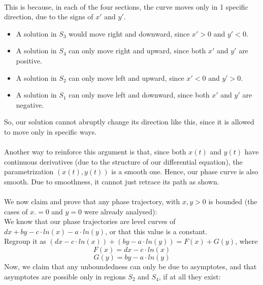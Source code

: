\documentclass{article}
\begin{document}
\\
This is because, in each of the four sections, the curve moves only in 1 specific direction, due to the signs of $x'$ and $y'$. 
\begin{itemize}
    \item A solution in $S_3$ would move right and downward, since $x' > 0$ and $y' < 0$.
    \item A solution in $S_4$ can only move right and upward, since both $x'$ and $y'$ are positive.
    \item A solution in $S_2$ can only move left and upward, since $x' < 0$ and $y' > 0$.
    \item A solution in $S_1$ can only move left and downward, since both $x'$ and $y'$ are negative.
\end{itemize}
So, our solution cannot abruptly change its direction like this, since it is allowed to move only in specific ways. 
\\
\\Another way to reinforce this argument is that, since both $x(t)$ and $y(t)$ have continuous derivatives (due to the structure of our differential equation), the parametrization $(x(t), y(t))$ is a smooth one. Hence, our phase curve is also smooth. Due to smoothness, it cannot just retrace its path as shown.
\\
\\
We now claim and prove that any phase trajectory, with $x, y > 0$ is bounded (the cases of $x. = 0$ and $y = 0$ were already analysed):
\\
We know that our phase trajectories are level curves of $dx + by - c\cdot ln(x) - a\cdot ln(y)$, or that this value is a constant.\\
Regroup it as $(dx - c\cdot ln(x)) + (by - a\cdot ln(y)) = F(x) + G(y)$, where
$$F(x) = dx - c\cdot ln(x)$$
$$G(y) = by - a\cdot ln(y)$$
Now, we claim that any unboundedness can only be due to asymptotes, and that asymptotes are possible only in regions $S_2$ and $S_4$, if at all they exist:
\end{document}
